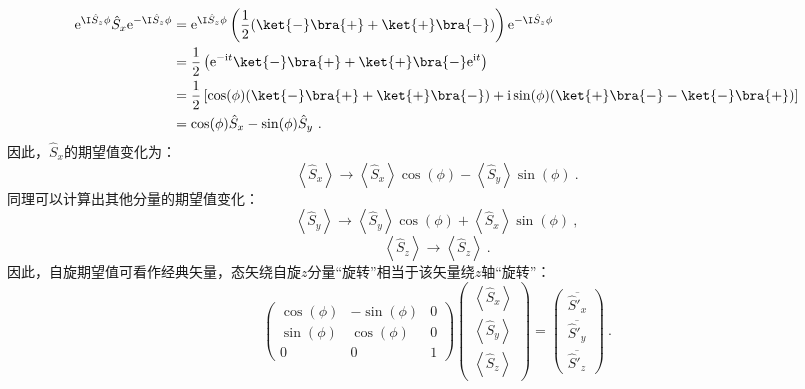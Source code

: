 \begin{equation}
\begin{aligned}
\mathrm e^{ \I\hat S_z\phi}\hat S_x\mathrm e^{- \I\hat S_z\phi}&=\mathrm e^{ \I\hat S_z\phi}\left(\frac{1}{2}(\ket{-}\bra{+}+\ket{+}\bra{-})\right)\mathrm e^{- \I\hat S_z\phi}\\
 &=\frac{1}{2}\left(\mathrm e^{-\mathrm i t}\ket{-}\bra{+}+\ket{+}\bra{-}\mathrm e^{\mathrm i t}\right)\\
 &=\frac{1}{2}\left[\cos(\phi)(\ket{-}\bra{+}+\ket{+}\bra{-})+\mathrm i\sin(\phi)(\ket{+}\bra{-}-\ket{-}\bra{+})\right]\\
 &=\cos(\phi) \hat S_x-\sin(\phi) \hat S_y~.
\end{aligned}
\end{equation}
因此，$\hat S_x$的期望值变化为：
\begin{equation}
\left\langle \hat S_{x}\right\rangle\rightarrow  \left\langle \hat S_{x}\right\rangle\cos(\phi)-\left\langle \hat S_{y}\right\rangle\sin(\phi)~.
\end{equation}
同理可以计算出其他分量的期望值变化：
\begin{equation}
\left\langle \hat S_{y}\right\rangle\rightarrow \left\langle \hat S_{y}\right\rangle\cos(\phi)+\left\langle \hat S_{x}\right\rangle\sin(\phi)~,
\end{equation}
\begin{equation}
\left\langle \hat S_{z}\right\rangle\rightarrow \left\langle \hat S_{z}\right\rangle~.
\end{equation}
因此，自旋期望值可看作经典矢量，态矢绕自旋$z$分量“旋转”相当于该矢量绕$z$轴“旋转”：
\begin{equation}
\begin{pmatrix}
 \cos(\phi) &-\sin(\phi)  &0 \\
  \sin(\phi) & \cos(\phi)  & 0\\
  0& 0 &1
\end{pmatrix}
\begin{pmatrix}
 \left\langle \hat S_{x}\right\rangle\\
  \left\langle \hat S_{y}\right\rangle\\
 \left\langle \hat S_{z}\right\rangle
\end{pmatrix}
=
\begin{pmatrix}
  \overline{\hat S'_x}\\
  \overline{\hat S'_y}\\
 \overline{\hat S'_z}
\end{pmatrix}~.
\end{equation}

